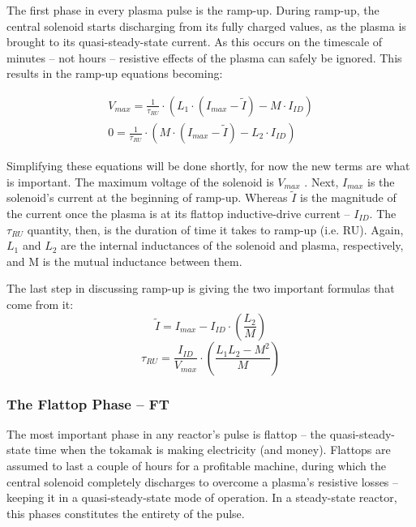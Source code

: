 The first phase in every plasma pulse is the ramp-up. During ramp-up, the central solenoid starts discharging from its fully charged values, as the plasma is brought to its quasi-steady-state current. As this occurs on the timescale of minutes -- not hours -- resistive effects of the plasma can safely be ignored. This results in the ramp-up equations becoming:

\begin{align}
	V_{max} = \frac{1}{\tau_{RU}} \cdot \left( L_1 \cdot ( I_{max} - \tilde I ) - M \cdot I_{ID} \right) \\
	0 = \frac{1}{\tau_{RU}} \cdot \left( M \cdot ( I_{max} - \tilde I ) - L_2 \cdot I_{ID} \right)
\end{align}

Simplifying these equations will be done shortly, for now the new terms are what is important. The maximum voltage of the solenoid is $V_{max}$ . Next, $I_{max}$ is the solenoid's current at the beginning of ramp-up. Whereas $\tilde I$ is the magnitude of the current once the plasma is at its flattop inductive-drive current -- $I_{ID}$. The $\tau_{RU}$ quantity, then, is the duration of time it takes to ramp-up (i.e. RU). Again, $L_1$ and $L_2$ are the  internal inductances of the solenoid and plasma, respectively, and M is the mutual inductance between them.

The last step in discussing ramp-up is giving the two important formulas that come from it:
\begin{equation}
	\label{eq:itilde}
	\tilde I = I_{max} - I_{ID} \cdot \left( \frac{L_2}{M} \right)
\end{equation}
\begin{equation}
	\label{eq:tauru}
	\tau_{RU} = \frac{I_{ID}}{V_{max}} \cdot \left( \frac{ L_1 L_2 - M^2 }{ M } \right)
\end{equation}

\subsubsection{The Flattop Phase -- FT}

The most important phase in any reactor's pulse is flattop -- the quasi-steady-state time when the tokamak is making electricity (and money). Flattops are assumed to last a couple of hours for a profitable machine, during which the central solenoid completely discharges to overcome a plasma's resistive losses -- keeping it in a quasi-steady-state mode of operation. In a steady-state reactor, this phases constitutes the entirety of the pulse.

